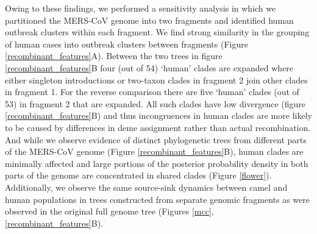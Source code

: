 \documentclass[9pt,lineno]{elife}
\begin{document}
Owing to these findings, we performed a sensitivity analysis in which we partitioned the MERS-CoV genome into two fragments and identified human outbreak clusters within each fragment.
We find strong similarity in the grouping of human cases into outbreak clusters between fragments (Figure \ref{recombinant_features}A).
Between the two trees in figure \ref{recombinant_features}B four (out of 54) `human' clades are expanded where either singleton introductions or two-taxon clades in fragment 2 join other clades in fragment 1.
For the reverse comparison there are five `human' clades (out of 53) in fragment 2 that are expanded.
All such clades have low divergence (figure \ref{recombinant_features}B) and thus incongruences in human clades are more likely to be caused by differences in deme assignment rather than actual recombination.
And while we observe evidence of distinct phylogenetic trees from different parts of the MERS-CoV genome (Figure \ref{recombinant_features}B), human clades are minimally affected and large portions of the posterior probability density in both parts of the genome are concentrated in shared clades (Figure \ref{flower}).
Additionally, we observe the same source-sink dynamics between camel and human populations in trees constructed from separate genomic fragments as were observed in the original full genome tree (Figures \ref{mcc}, \ref{recombinant_features}B).
\end{document}
